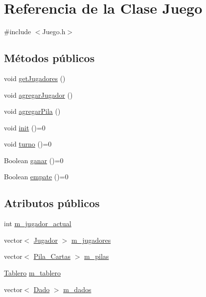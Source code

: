 \hypertarget{class_juego}{\section{Referencia de la Clase Juego}
\label{class_juego}
}


{\ttfamily \#include $<$Juego.\-h$>$}

\subsection*{Métodos públicos}
\begin{DoxyCompactItemize}
\item 
void \hyperlink{class_juego_a310d8104fa3bbae0e3aef86cf8402e0b}{get\-Jugadores} ()
\item 
void \hyperlink{class_juego_aa54324b1e60f38e28a6ebdc5a7bdf53f}{agregar\-Jugador} ()
\item 
void \hyperlink{class_juego_aa4e9c0acfb3df36f80ec6870cd2d716e}{agregar\-Pila} ()
\item 
void \hyperlink{class_juego_a1192b532b7acfa034ddc7765caddf86b}{init} ()=0
\item 
void \hyperlink{class_juego_a8f105958f2e8ff26ff60a16266196fab}{turno} ()=0
\item 
Boolean \hyperlink{class_juego_a0cb4bcc07da4a90d61a9f48b5c79c73e}{ganar} ()=0
\item 
Boolean \hyperlink{class_juego_aea9cd9c077eeba2f948f41669f0002b9}{empate} ()=0
\end{DoxyCompactItemize}
\subsection*{Atributos públicos}
\begin{DoxyCompactItemize}
\item 
int \hyperlink{class_juego_adffd6dea5ae36c243402d2401cd9848e}{m\-\_\-jugador\-\_\-actual}
\item 
vector$<$ \hyperlink{class_jugador}{Jugador} $>$ \hyperlink{class_juego_ae9f2b6939836c66d00e3745ebd2dc466}{m\-\_\-jugadores}
\item 
vector$<$ \hyperlink{class_pila___cartas}{Pila\-\_\-\-Cartas} $>$ \hyperlink{class_juego_aa1cd4f06e664635c86bc07ddaff214f1}{m\-\_\-pilas}
\item 
\hyperlink{class_tablero}{Tablero} \hyperlink{class_juego_a4a9eae54cdd122d941e15e1dfb65dcac}{m\-\_\-tablero}
\item 
vector$<$ \hyperlink{class_dado}{Dado} $>$ \hyperlink{class_juego_a9ffb7ca3c51b48a865a009e1f20d7f31}{m\-\_\-dados}
\end{DoxyCompactItemize}


